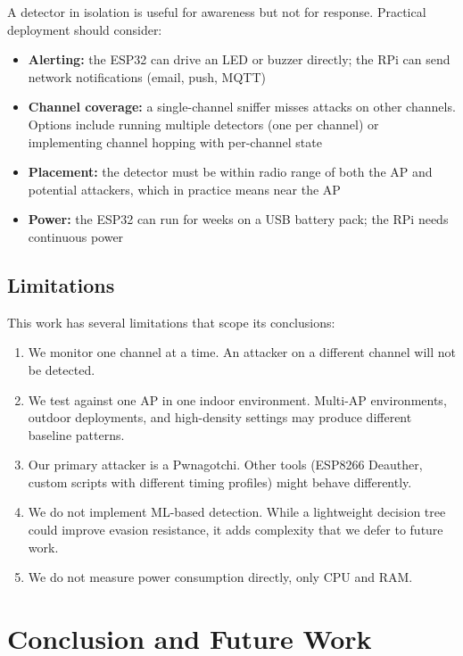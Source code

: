 \documentclass[conference]{IEEEtran}
\begin{document}
A detector in isolation is useful for awareness but not for response. Practical deployment should consider:
\begin{itemize}
    \item \textbf{Alerting:} the ESP32 can drive an LED or buzzer directly; the RPi can send network notifications (email, push, MQTT)
    \item \textbf{Channel coverage:} a single-channel sniffer misses attacks on other channels. Options include running multiple detectors (one per channel) or implementing channel hopping with per-channel state
    \item \textbf{Placement:} the detector must be within radio range of both the AP and potential attackers, which in practice means near the AP
    \item \textbf{Power:} the ESP32 can run for weeks on a USB battery pack; the RPi needs continuous power
\end{itemize}

\subsection{Limitations}

This work has several limitations that scope its conclusions:

\begin{enumerate}
    \item We monitor one channel at a time. An attacker on a different channel will not be detected.
    \item We test against one AP in one indoor environment. Multi-AP environments, outdoor deployments, and high-density settings may produce different baseline patterns.
    \item Our primary attacker is a Pwnagotchi. Other tools (ESP8266 Deauther, custom scripts with different timing profiles) might behave differently.
    \item We do not implement ML-based detection. While a lightweight decision tree could improve evasion resistance, it adds complexity that we defer to future work.
    \item We do not measure power consumption directly, only CPU and RAM.
\end{enumerate}

\section{Conclusion and Future Work}
\label{sec:conclusion}
\end{document}
